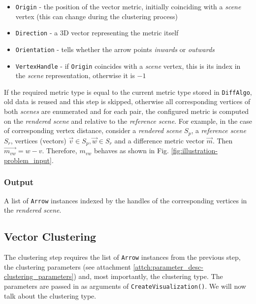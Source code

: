 \begin{itemize}
\item \verb+Origin+ - the position of the vector metric, initially coinciding with a {\it scene} vertex (this can change during the clustering process)
\item \verb+Direction+ - a 3D vector representing the metric itself
\item \verb+Orientation+ - tells whether the arrow points {\it inwards} or {\it outwards}
\item \verb+VertexHandle+ - if \verb+Origin+ coincides with a {\it scene} vertex, this is its index in the {\it scene} representation, otherwise it is \(-1\)
\end{itemize}

If the required metric type is equal to the current metric type stored in \verb+DiffAlgo+, old data is reused and this step is skipped, otherwise all corresponding vertices of both {\it scenes} are enumerated and for each pair, the configured metric is computed on the {\it rendered scene} and relative to the {\it reference scene}. For example, in the case of corresponding vertex distance, consider a {\it rendered scene} \(S_p\), a {\it reference scene} \(S_r\), vertices (vectors) \(\overrightarrow{v} \in S_p, \overrightarrow{w} \in S_r\) and a difference metric vector \(\overrightarrow{m}\). Then \(\overrightarrow{m_{vw}} = w - v\). Therefore, \(m_{vw}\) behaves as shown in Fig. \ref{fig:illustration-problem_input}.

\subsubsection{Output}

A list of \verb+Arrow+ instances indexed by the handles of the corresponding vertices in the {\it rendered scene}.

\subsection{Vector Clustering}
\label{subsec:implementation-algorithm-clustering}

The clustering step requires the list of \verb+Arrow+ instances from the previous step, the clustering parameters (see attachment \ref{attch:parameter_desc-clustering_parameters}) and, most importantly, the clustering type. The parameters are passed in as arguments of \verb+CreateVisualization()+. We will now talk about the clustering type.

